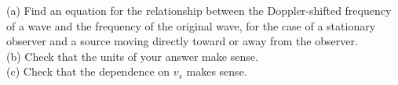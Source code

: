 (a) Find an equation for the relationship between the
Doppler-shifted frequency of a wave and the frequency of the
original wave, for the case of a stationary observer and a
source moving directly toward or away from the observer.\\
(b) Check that the units of your answer make sense.\\
(c) Check that the dependence on $v_s$ makes sense.
